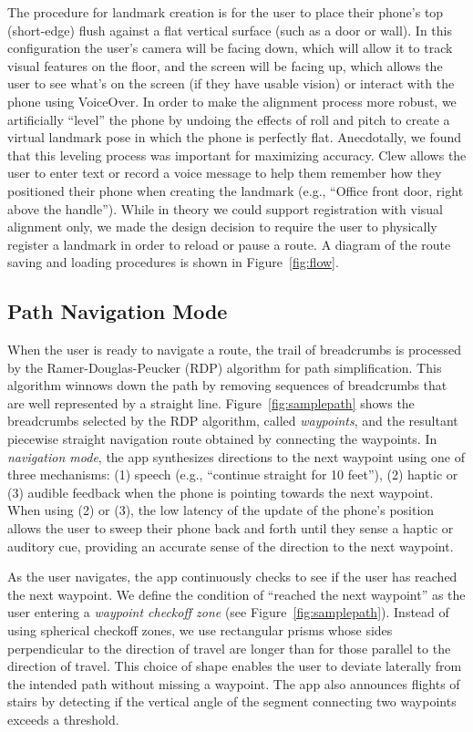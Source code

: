 \documentclass[chi_draft]{sigchi}
\begin{document}
The procedure for landmark creation is for the user to place their phone's top (short-edge) flush against a flat vertical surface (such as a door or wall).  In this configuration the user's camera will be facing down, which will allow it to track visual features on the floor, and the screen will be facing up, which allows the user to see what's on the screen (if they have usable vision) or interact with the phone using VoiceOver.  In order to make the alignment process more robust, we artificially ``level'' the phone by undoing the effects of roll and pitch to create a virtual landmark pose in which the phone is perfectly flat.  Anecdotally, we found that this leveling process was important for maximizing accuracy.  Clew allows the user to enter text or record a voice message to help them remember how they positioned their phone when creating the landmark (e.g., ``Office front door, right above the handle'').  While in theory we could support registration with visual alignment only, we made the design decision to require the user to physically register a landmark in order to reload or pause a route.  A diagram of the route saving and loading procedures is shown in Figure~\ref{fig:flow}.

\subsection{Path Navigation Mode}\label{sec:pathnavigationmode}

When the user is ready to navigate a route, the trail of breadcrumbs is processed by the Ramer-Douglas-Peucker (RDP) algorithm \cite{douglas1973algorithms} for path simplification.  This algorithm winnows down the path by removing sequences of breadcrumbs that are well represented by a straight line.  Figure~\ref{fig:samplepath} shows the breadcrumbs selected by the RDP algorithm, called \emph{waypoints}, and the resultant piecewise straight navigation route obtained by connecting the waypoints.  In \emph{navigation mode}, the app synthesizes directions to the next waypoint using one of three mechanisms: (1) speech (e.g., ``continue straight for 10 feet''), (2) haptic or (3) audible feedback when the phone is pointing towards the next waypoint.  When using (2) or (3), the low latency of the update of the phone's position allows the user to sweep their phone back and forth until they sense a haptic or auditory cue, providing an accurate sense of the direction to the next waypoint.

As the user navigates, the app continuously checks to see if the user has reached the next waypoint.  We define the condition of ``reached the next waypoint'' as the user entering a \emph{waypoint checkoff zone} (see Figure~\ref{fig:samplepath}).  Instead of using spherical checkoff zones, we use rectangular prisms whose sides perpendicular to the direction of travel are longer than for those parallel to the direction of travel.  This choice of shape enables the user to deviate laterally from the intended path without missing a waypoint.  The app also announces flights of stairs by detecting if the vertical angle of the segment connecting two waypoints exceeds a threshold.
\end{document}

